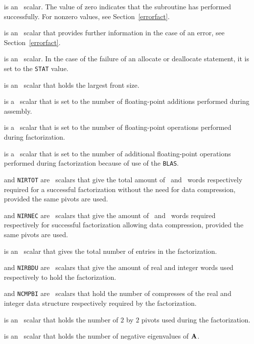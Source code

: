 \documentclass{galahad}
\begin{document}
\begin{description}

 is an \integer\ scalar. The value 
 of zero indicates that the subroutine has performed 
 successfully.  For nonzero values, see Section~\ref{errorfact}. 
 
 is an \integer\ scalar that provides further information in the 
case of an error, see Section~\ref{errorfact}. 
 
 is an \integer\ scalar. In the case of the failure of an 
allocate or deallocate statement, it is set to the {\tt STAT} value. 
 
  is an \integer\ scalar that holds the largest front size. 
 
 is a \realdp\ scalar that is set to the number of 
 floating-point additions performed during assembly. 
 
 is a \realdp\ scalar that is set to the number of 
 floating-point operations performed during factorization. 
 
 is a \realdp\ scalar that is set to the number of 
 additional floating-point operations performed during factorization 
 because of use of the {\tt BLAS}. 
 
 and {\tt NIRTOT} are \integer\ scalars that give the total 
 amount of \realdp\ and \integer\ words respectively required for a 
 successful factorization without the need for data compression, 
 provided the same pivots are used.  
 
 and {\tt NIRNEC} are \integer\ scalars that give the amount 
 of  \realdp\ and \integer\ words required respectively for successful 
 factorization allowing data compression, provided 
 the same pivots are used.  
 
 is an \integer\ scalar that gives the total number of  
 entries in the factorization. 
 
 and {\tt NIRBDU} are \integer\ scalars that give the amount of 
 real and integer words used respectively to hold the factorization. 
 
 and {\tt NCMPBI} are \integer\ scalars that hold the number of 
 compresses of the real and integer data structure respectively 
 required by the factorization. 
 
 is an \integer\ scalar that holds 
 the number of $2$ by $2$ pivots used during the factorization. 
 
 is an \integer\ scalar that holds 
 the number of negative eigenvalues of ${\mathbf{A}}$. 
 

\end{description}
\end{document}
